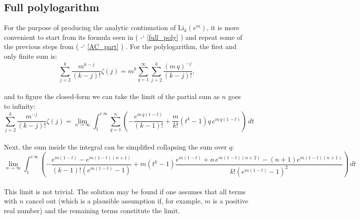 \documentclass[12pt]{article}
\newcommand*{\secrefe}[1]{%
\begingroup
(\color{Aquamarine}
\romannumeral-`\x %
\setcitestyle{numbers}%
\ref{#1}%
\endgroup
)\ignorespacesafterend
}
\begin{document}
\subsection{Full polylogarithm}
For the purpose of producing the analytic continuation of $\mathrm{Li}_{k}(e^{m})$, it is more convenient to start from its formula seen in \secrefe{full_poly} and repeat some of the previous steps from \secrefe{AC_part}. For the polylogarithm, the first and only finite sum is:
\begin{equation} \nonumber
\sum_{j=2}^{k}\frac{m^{k-j}}{(k-j)!}\zeta(j)=m^k\sum_{q=1}^{\infty}\sum_{j=2}^{k}\frac{(m\,q)^{-j}}{(k-j)!} \text{,}
\end{equation}\\
\noindent and to figure the closed-form we can take the limit of the partial sum as $n$ goes to infinity:
\begin{equation} \nonumber
\sum_{j=2}^{k}\frac{m^{-j}}{(k-j)!}\zeta(j)=\lim_{n\to\infty}\int_{1}^{c\,\infty}\sum_{q=1}^{n}\left(-\frac{e^{m\,q(1-t)}}{(k-1)!}+\frac{m}{k!}\left(t^k-1\right)q\,e^{m\,q(1-t)}\right)\,dt \text{}
\end{equation}\\
\indent Next, the sum inside the integral can be simplified collapsing the sum over $q$:
\begin{equation} \nonumber
\lim_{n\to\infty}\int_{1}^{c\,\infty}\left(-\frac{e^{m(1-t)}-e^{m(1-t)(n+1)}}{(k-1)!\left(e^{m(1-t)}-1\right)}+m\left(t^k-1\right)\frac{e^{m(1-t)}+n\,e^{m(1-t)(n+2)}-(n+1)e^{m(1-t)(n+1)}}{k!\left(e^{m(1-t)}-1\right)^2}\right)\,dt
\end{equation}\\
\indent This limit is not trivial. The solution may be found if one assumes that all terms with $n$ cancel out (which is a plausible assumption if, for example, $m$ is a positive real number) and the remaining terms constitute the limit.\\
\end{document}
